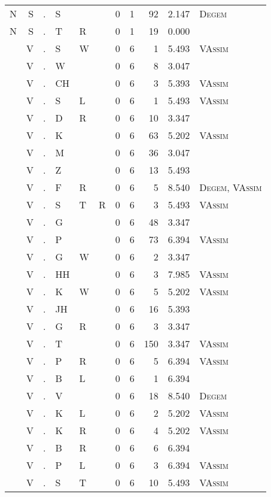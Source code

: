 \begin{longtable}{r@{ } r@{ } c@{ } l@{ } l@{ } l@{ } r r r r l }
N & S & . & S &  &  & 0 & 1 & 92 & 2.147 & \textsc{Degem} \\
N & S & . & T & R &  & 0 & 1 & 19 & 0.000 &  \\
 & V & . & S & W &  & 0 & 6 & 1 & 5.493 & \textsc{VAssim} \\
 & V & . & W &  &  & 0 & 6 & 8 & 3.047 &  \\
 & V & . & CH &  &  & 0 & 6 & 3 & 5.393 & \textsc{VAssim} \\
 & V & . & S & L &  & 0 & 6 & 1 & 5.493 & \textsc{VAssim} \\
 & V & . & D & R &  & 0 & 6 & 10 & 3.347 &  \\
 & V & . & K &  &  & 0 & 6 & 63 & 5.202 & \textsc{VAssim} \\
 & V & . & M &  &  & 0 & 6 & 36 & 3.047 &  \\
 & V & . & Z &  &  & 0 & 6 & 13 & 5.493 &  \\
 & V & . & F & R &  & 0 & 6 & 5 & 8.540 & \textsc{Degem}, \textsc{VAssim} \\
 & V & . & S & T & R & 0 & 6 & 3 & 5.493 & \textsc{VAssim} \\
 & V & . & G &  &  & 0 & 6 & 48 & 3.347 &  \\
 & V & . & P &  &  & 0 & 6 & 73 & 6.394 & \textsc{VAssim} \\
 & V & . & G & W &  & 0 & 6 & 2 & 3.347 &  \\
 & V & . & HH &  &  & 0 & 6 & 3 & 7.985 & \textsc{VAssim} \\
 & V & . & K & W &  & 0 & 6 & 5 & 5.202 & \textsc{VAssim} \\
 & V & . & JH &  &  & 0 & 6 & 16 & 5.393 &  \\
 & V & . & G & R &  & 0 & 6 & 3 & 3.347 &  \\
 & V & . & T &  &  & 0 & 6 & 150 & 3.347 & \textsc{VAssim} \\
 & V & . & P & R &  & 0 & 6 & 5 & 6.394 & \textsc{VAssim} \\
 & V & . & B & L &  & 0 & 6 & 1 & 6.394 &  \\
 & V & . & V &  &  & 0 & 6 & 18 & 8.540 & \textsc{Degem} \\
 & V & . & K & L &  & 0 & 6 & 2 & 5.202 & \textsc{VAssim} \\
 & V & . & K & R &  & 0 & 6 & 4 & 5.202 & \textsc{VAssim} \\
 & V & . & B & R &  & 0 & 6 & 6 & 6.394 &  \\
 & V & . & P & L &  & 0 & 6 & 3 & 6.394 & \textsc{VAssim} \\
 & V & . & S & T &  & 0 & 6 & 10 & 5.493 & \textsc{VAssim} \\

\end{longtable}
